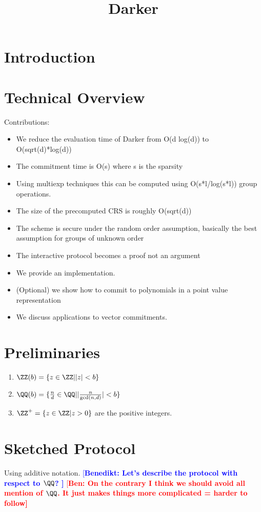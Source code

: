 \documentclass[12pt]{article}
\title{Darker}
\theoremstyle{Definition}
\newcommand{\ben}[1]{{\textcolor{red}{[\bf Ben: #1]}}}
\newcommand{\benedikt}[1]{{\textcolor{blue}{[\bf Benedikt: #1]}}}
\newcommand{\ben}[1]{}
\begin{document}
	
\maketitle
\section{Introduction}
\section{Technical Overview}
Contributions:
\begin{itemize}
	\item We reduce the evaluation time of Darker from O(d log(d)) to O(sqrt(d)*log(d))
	\item The commitment time is O(s) where s is the sparsity 
	\item Using multiexp techniques this can be computed using O(s*l/log(s*l)) group operations. 
	\item The size of the precomputed CRS is roughly O(sqrt(d))
	\item The scheme is secure under the random order assumption, basically the best assumption for groups of unknown order
	\item The interactive protocol becomes a proof not an argument
	\item We provide an implementation.
	\item (Optional) we show how to commit to polynomials in a point value representation
	\item We discuss applications to vector commitments. 
\end{itemize}

\section{Preliminaries}
\begin{enumerate}
	\item $\ZZ(b)=\{ z \in \ZZ | |z|<b\}$
	\item $\QQ(b)=\{\frac{n}{d} \in \QQ | |\frac{n}{\gcd(n,d)}|< b\}$
	\item $\ZZ^+=\{z \in \ZZ | z>0\}$ are the positive integers.
	\end{enumerate}
\section{Sketched Protocol}
Using additive notation. 
\benedikt{Let's describe the protocol with respect to $\QQ$? }
\ben{On the contrary I think we should avoid all mention of $\QQ$. It just makes things more complicated = harder to follow} 
\end{document}
